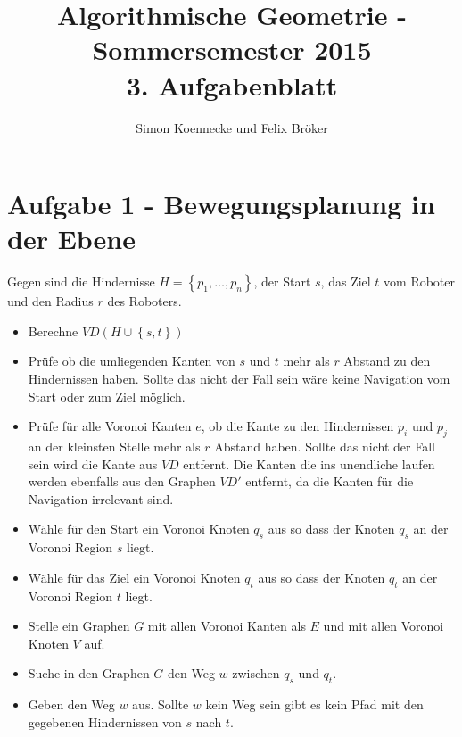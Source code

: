 \documentclass[a4paper]{article}
\begin{document}
\title{Algorithmische Geometrie - Sommersemester 2015\\
       3. Aufgabenblatt }
\author{Simon Koennecke und Felix Bröker}
\date{}
\maketitle

\section*{Aufgabe 1 - Bewegungsplanung in der Ebene}

Gegen sind die Hindernisse $H = \left\{p_1, \dots, p_n\right\}$, der Start $s$, das Ziel $t$ vom Roboter und den Radius $r$ des Roboters.

\begin{itemize}

\item Berechne $VD(H \cup \left\{s,t\right\})$

\item Prüfe ob die umliegenden Kanten von $s$ und $t$ mehr als $r$ Abstand zu den Hindernissen haben. Sollte das nicht der Fall sein wäre keine Navigation vom Start oder zum Ziel möglich.

\item Prüfe für alle Voronoi Kanten $e$, ob die Kante zu den Hindernissen $p_i$ und $p_j$ an der kleinsten Stelle mehr als $r$ Abstand haben. Sollte das nicht der Fall sein wird die Kante aus $VD$ entfernt. Die Kanten die ins unendliche laufen werden ebenfalls aus den Graphen $VD'$ entfernt, da die Kanten für die Navigation irrelevant sind.

\item Wähle für den Start ein Voronoi Knoten $q_s$ aus so dass der Knoten $q_s$ an der Voronoi Region $s$ liegt.

\item Wähle für das Ziel ein Voronoi Knoten $q_t$ aus so dass der Knoten $q_t$ an der Voronoi Region $t$ liegt.

\item Stelle ein Graphen $G$ mit allen Voronoi Kanten als $E$ und mit allen Voronoi Knoten $V$ auf.

\item Suche in den Graphen $G$ den Weg $w$ zwischen $q_s$ und $q_t$.

\item Geben den Weg $w$ aus. Sollte $w$ kein Weg sein gibt es kein Pfad mit den gegebenen Hindernissen von $s$ nach $t$.

\end{itemize}  
\end{document}
